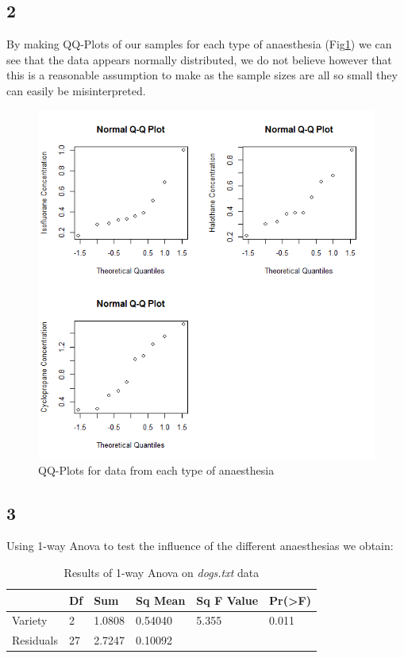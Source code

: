 \documentclass{article}
\begin{document}
    \subsection*{2}
    By making QQ-Plots of our samples for each type of anaesthesia (Fig\ref{fig:qq dog}) we can see that the data appears normally distributed, we do not believe however that this is a reasonable assumption to make as the sample sizes are all so small they can easily be misinterpreted.
    
    \begin{figure}[H]
    \centering
      \includegraphics[scale=0.4]{../results/4_2.png}
      \caption{QQ-Plots for data from each type of anaesthesia}
      \label{fig:qq dog}
    \end{figure}
    
    \subsection*{3}
    Using 1-way Anova to test the influence of the different anaesthesias we obtain:
    
    \begin{table}[H]
    \begin{center}
    \begin{tabular}{l|lllll}
        \hline 
        & Df & Sum & Sq Mean & Sq F Value & Pr(>F) \\
        \hline
        Variety & 2 & 1.0808 & 0.54040 & 5.355 & 0.011 \\
        \hline
        Residuals & 27 & 2.7247 & 0.10092 \\
        \hline
    \end{tabular}
    \caption{Results of 1-way Anova on \textit{dogs.txt} data}
    \label{table:2anova}
    \end{center}
    \end{table}
    
\end{document}
